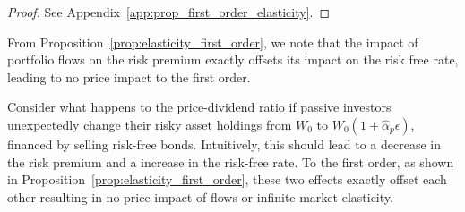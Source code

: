 \begin{prop}
\end{prop}
\begin{proof}
	See Appendix~\ref{app:prop_first_order_elasticity}.
\end{proof}
From Proposition~\ref{prop:elasticity_first_order}, we note that the impact of portfolio flows on the risk premium exactly offsets its impact on the risk free rate, leading to no price impact to the first order. 

Consider what happens to the price-dividend ratio if passive investors unexpectedly change their risky asset holdings from $ W_0 $ to $ W_0\left(1+\hat{\alpha}_p\epsilon\right) $, financed by selling risk-free bonds. Intuitively, this should lead to a decrease in the risk premium and a increase in the risk-free rate. To the first order, as shown in Proposition~\ref{prop:elasticity_first_order}, these two effects exactly offset each other resulting in no price impact of flows or infinite market elasticity. 

